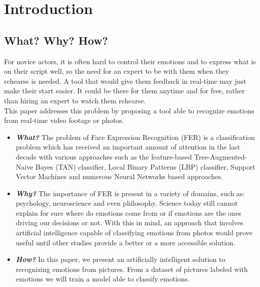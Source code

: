 \documentclass[runningheads,a4paper,11pt]{report}
\begin{document}
\newpage




\newpage



 


\chapter{Introduction}
\label{chapter:introduction}

\section{What? Why? How?}
\label{section:what}

For novice actors, it is often hard to control their emotions and to express what is on their script well, so the need for an expert to be with them when they rehearse is needed. A tool that would give them feedback in real-time may just make their start easier. It could be there for them anytime and for free, rather than hiring an expert to watch them rehearse.\\
This paper addresses this problem by proposing a tool able to recognize emotions from real-time video footage or photos.

\begin{itemize}
	\item \textbf{\emph{What?}} The problem of Face Expression Recognition (FER) is a classification problem which has received an important amount of attention in the last decade with various approaches such as the feature-based Tree-Augmented-Naive Bayes (TAN) classifier, Local Binary Patterns (LBP) classifier, Support Vector Machines and numerous Neural Networks based approaches. \cite{Caleanu13}
	\item \textbf{\emph{Why?}} The importance of FER is present in a variety of domains, such as: psychology, neuroscience and even philosophy. Science today still cannot explain for sure where do emotions come from or if emotions are the ones driving our decisions or not. With this in mind, an approach that involves artificial intelligence capable of classifying emotions from photos would prove useful until other studies provide a better or a more accessible solution.
	\item \textbf{\emph{How?}} In this paper, we present an artificially intelligent solution to recognizing emotions from pictures. From a dataset of pictures labeled with emotions we will train a model able to classify emotions.
\end{itemize}
\end{document}
